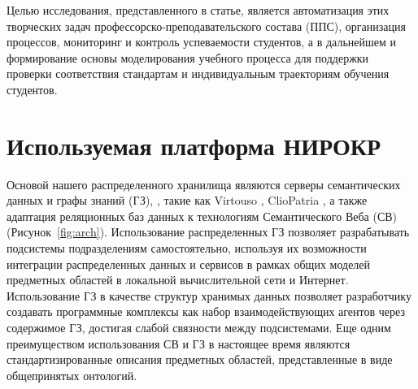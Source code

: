 \documentclass[ 

]{aiitart}
\begin{document}


Целью исследования, представленного в статье, является автоматизация этих творческих задач профессорско-преподавательского состава (ППС), организация процессов, мониторинг и контроль успеваемости студентов, а в дальнейшем и формирование основы моделирования учебного процесса для поддержки проверки соответствия стандартам и индивидуальным траекториям обучения студентов. 

\section{Используемая платформа НИРОКР} 

Основой нашего распределенного хранилища являются серверы семантических данных и графы знаний (ГЗ), \cite{kg}, такие как Virtouso \cite{virtuoso}, ClioPatria \cite{b8}, а также адаптация реляционных баз данных к технологиям Семантического Веба (СВ)~\cite{tbl} (Рисунок~\ref{fig:arch}). Использование распределенных ГЗ позволяет разрабатывать подсистемы подразделениям самостоятельно, используя их возможности интеграции распределенных данных и сервисов в рамках общих моделей предметных областей в локальной вычислительной сети и Интернет. Использование ГЗ в качестве структур хранимых данных позволяет разработчику создавать программные комплексы как набор взаимодействующих агентов через содержимое ГЗ, достигая слабой связности между подсистемами. Еще одним преимуществом использования СВ и ГЗ в настоящее время являются стандартизированные описания предметных областей, представленные в виде общепринятых онтологий. 
\end{document}
